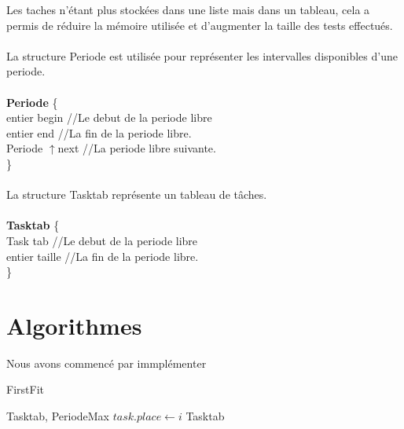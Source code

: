 \documentclass[11pt]{article}
\begin{document}
\noindent Les taches n'étant plus stockées dans une liste mais dans un tableau, cela a permis de réduire la mémoire utilisée et d'augmenter la taille des tests effectués.\\\\
La structure Periode est utilisée pour représenter les intervalles disponibles d'une periode.\\\\
\indent \textbf{Periode} \{ \\
    \indent \indent entier begin    \indent \indent//Le debut de la periode libre\\
    \indent \indent entier end \indent \indent //La fin de la periode libre.\\
    \indent \indent Periode $\uparrow$next \indent //La periode libre suivante.\\
\indent\}
\\\\
La structure Tasktab représente un tableau de tâches.\\\\
\indent \textbf{Tasktab} \{ \\
    \indent \indent Task tab    \indent \indent//Le debut de la periode libre\\
    \indent \indent entier taille \indent   //La fin de la periode libre.\\
\indent\}

\section{Algorithmes}

Nous avons commencé par immplémenter 
\begin{algorithm}
    \caption{FirstFit}
    \begin{algorithmic}
    \REQUIRE Tasktab, PeriodeMax
            \STATE $task.place \leftarrow i$
         \ENDIF
        \ENDFOR
    \ENDFOR
    \RETURN Tasktab
    \end{algorithmic}
\end{algorithm}
\end{document}
